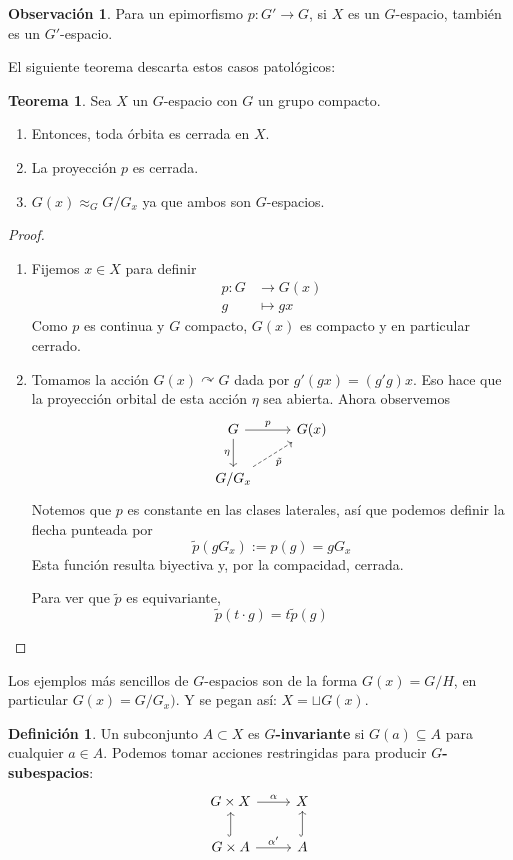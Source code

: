 \documentclass[spanish]{article}
\theoremstyle{definition}
\newtheorem*{defn}{Definición}
\newtheorem*{obs}{Observación}
\newtheorem*{teo}{Teorema}
\begin{document}
\begin{obs}
	Para un epimorfismo $p:G'\to G$, si $X$ es un $G$-espacio, también es un $G'$-espacio.
\end{obs}
El siguiente teorema descarta estos casos patológicos:
\begin{teo}
	Sea $X$ un $G$-espacio con $G$ un grupo compacto.
	\begin{enumerate}
		\item Entonces, toda órbita es cerrada en $X$.
		\item[1.5] La proyección $p$ es cerrada.
		\item $G(x)\approx_GG/G_x$ ya que ambos son $G$-espacios.
	\end{enumerate}
\end{teo}
\begin{proof}\leavevmode
\begin{enumerate}
	\item 	Fijemos $x\in X$ para definir
	\begin{align*}
		p:G&\to G(x)\\
		g&\mapsto gx
	\end{align*}
	Como $p$ es continua y $G$ compacto, $G(x)$ es compacto y en particular cerrado.
	\item Tomamos la acción $G(x)\curvearrowright G$ dada por $g'(gx)=(g'g)x$. Eso hace que la proyección orbital de esta acción $\eta$ sea abierta. Ahora observemos
	\[\begin{tikzcd}
		G\arrow[r,"p"]\arrow[d,"\eta",swap]&G(x)\\
		G/G_x\arrow[ur,swap,dashed,"\tilde{p}"]
	\end{tikzcd}\]
	Notemos que $p$ es constante en las clases laterales, así que podemos definir la flecha punteada por
	\[\tilde{p}(gG_x):=p(g)=gG_x\]
	Esta función resulta biyectiva y, por la compacidad, cerrada.
	
	Para ver que $\tilde{p}$ es equivariante,
	\[\tilde{p}(t\cdot g)=t\tilde{p}(g)\]
\end{enumerate}
\end{proof}
Los ejemplos más sencillos de $G$-espacios son de la forma $G(x)=G/H$, en particular $G(x)=G/G_x)$. Y se pegan así: $X=\sqcup G(x)$.
\begin{defn}
	Un subconjunto $A\subset X$ es \textbf{$G$-invariante} si $G(a)\subseteq A$ para cualquier $a\in A$.
	Podemos tomar acciones restringidas para producir \textbf{$G$-subespacios}:
	\[\begin{tikzcd}
		G\times X\arrow[r,"\alpha"]&X\\
		G\times A\arrow[u,hook]\arrow[r,"\alpha'"]&A\arrow[u,hook]
	\end{tikzcd}\]
\end{defn}
\end{document}
